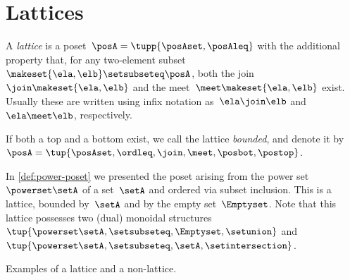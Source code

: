 
\section{Lattices}


\begin{definition}[Lattice]
    \label{def:lattice}
    A \emph{lattice} is a poset~$\posA=\tupp{\posAset,\posAleq}$ with the additional property that, for any two-element subset~$\makeset{\ela, \elb} \setsubseteq \posA$, both the join~$\join \makeset{\ela, \elb}$ and the meet~$\meet \makeset{\ela, \elb }$ exist.
    Usually these are written using infix notation as~$\ela \join \elb$ and~$\ela \meet \elb$, respectively.
\end{definition}

\begin{marginfigure}
    \centering
    \caption{}
    \label{fig:lattice-wood}
\end{marginfigure}

\begin{remark}
    \label{rem:bounded-lattices}
    If both a top and a bottom exist, we call the lattice \emph{bounded}, and denote it by~$\posA = \tup{\posAset,\ordleq,\join,\meet,\posbot,\postop}$.
\end{remark}

\begin{example}
    In \cref{def:power-poset} we presented the poset arising from the power set~$\powerset \setA$ of a set~$\setA$ and ordered via subset inclusion.
    This is a lattice, bounded by~$\setA$ and by the empty set~$\Emptyset$.
    Note that this lattice possesses two (dual) monoidal structures~$\tup{\powerset \setA,\setsubseteq,\Emptyset,\setunion}$ and~$\tup{\powerset \setA,\setsubseteq,\setA,\setintersection}$.
\end{example}

\begin{marginfigure}
    \centering

    \caption{Examples of a lattice and a non-lattice. }
    \label{fig:exlattice}
\end{marginfigure}

